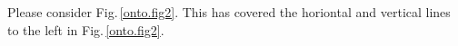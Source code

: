 \begynd
\pind Please consider Fig.\,\vref{onto.fig2}.
\begynd
\pind This  has covered \nyl the horiontal and vertical lines
      to the left in Fig.\,\ref{onto.fig2}.
\afslut
\afslut

\pos{}{\normalsize\vspace*{-16.225mm}
\qbtabular\\

\qetabular\HHHH}

\label{chap4.tex.n}

